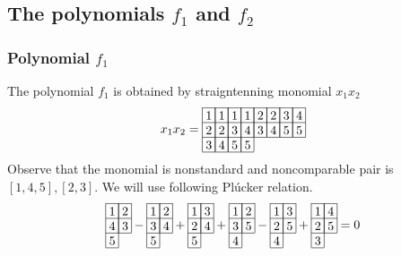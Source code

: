 \subsection{The polynomials \(f_1\) and \(f_2\)}
\subsubsection{Polynomial \(f_1\)}
The polynomial \(f_1\) is obtained by straigntenning monomial \(x_1x_2\)
\[
x_1x_2 = 
\begin{array}[c]{*{8}c}\cline{1-8}
\lr{1}&\lr{1}&\lr{1}&\lr{1}&\lr{2}&\lr{2}&\lr{3}&\lr{4}\\\cline{1-8}
\lr{2}&\lr{2}&\lr{3}&\lr{4}&\lr{3}&\lr{4}&\lr{5}&\lr{5}\\\cline{1-8}
\lr{3}&\lr{4}&\lr{5}&\lr{5}\\\cline{1-4}
\end{array}
\]
Observe that the monomial is nonstandard and noncomparable pair is \([1,4,5],[2,3]\). We will use following Pl\'{u}cker relation.
\[
\begin{array}[c]{*{2}c}\cline{1-2}
\lr{1}&\lr{2}\\\cline{1-2}
\lr{4}&\lr{3}\\\cline{1-2}
\lr{5}\\\cline{1-1}
\end{array}
-\begin{array}[c]{*{2}c}\cline{1-2}
\lr{1}&\lr{2}\\\cline{1-2}
\lr{3}&\lr{4}\\\cline{1-2}
\lr{5}\\\cline{1-1}
\end{array}
+\begin{array}[c]{*{2}c}\cline{1-2}
\lr{1}&\lr{3}\\\cline{1-2}
\lr{2}&\lr{4}\\\cline{1-2}
\lr{5}\\\cline{1-1}
\end{array}
+\begin{array}[c]{*{2}c}\cline{1-2}
\lr{1}&\lr{2}\\\cline{1-2}
\lr{3}&\lr{5}\\\cline{1-2}
\lr{4}\\\cline{1-1}
\end{array}
-\begin{array}[c]{*{2}c}\cline{1-2}
\lr{1}&\lr{3}\\\cline{1-2}
\lr{2}&\lr{5}\\\cline{1-2}
\lr{4}\\\cline{1-1}
\end{array}
+\begin{array}[c]{*{2}c}\cline{1-2}
\lr{1}&\lr{4}\\\cline{1-2}
\lr{2}&\lr{5}\\\cline{1-2}
\lr{3}\\\cline{1-1}
\end{array}
=0
\]
